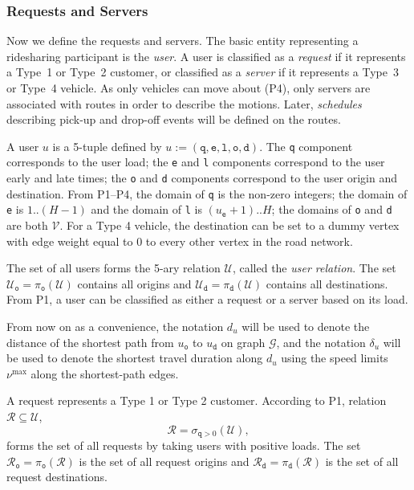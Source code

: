 \documentclass{article}
\newcommand{\hi}[1]{\noindent {\bf #1}}     %
\theoremstyle{definition}                   %
\begin{document}
\subsubsection{Requests and Servers}
\label{sec:requests-and-servers}
Now we define the requests and servers.
The basic entity representing a ridesharing participant is the \emph{user}.  A
user is classified as a \emph{request} if it represents a Type~1 or Type~2
customer, or classified as a \emph{server} if it represents a Type~3 or Type~4
vehicle. As only vehicles can move about (P4), only servers are associated with
routes in order to describe the motions. Later, \emph{schedules} describing
pick-up and drop-off events will be defined on the routes.

\hi{User Relation}
A user $u$ is a 5-tuple defined by
${u:=(\texttt{q},\texttt{e},\texttt{l},\texttt{o},\texttt{d})}$.  The
\texttt{q} component corresponds to the user load; the \texttt{e} and
\texttt{l} components correspond to the user early and late times; the
\texttt{o} and \texttt{d} components correspond to the user origin and
destination.
From P1--P4, the domain of \texttt{q} is the non-zero integers; the domain of \texttt{e} is
$1..(H-1)$ and the domain of \texttt{l} is $(u_\texttt{e}+1)..H$; the domains
of \texttt{o} and \texttt{d} are both $\mathcal{V}$.
For a Type 4 vehicle, the destination can be set to a dummy vertex with edge
weight equal to 0 to every other vertex in the road network.

The set of all users forms the 5-ary relation $\mathcal{U}$, called
the \emph{user relation}.
The set
$\mathcal{U}_\texttt{o}=\pi_\texttt{o}(\mathcal{U})$ contains all origins and
$\mathcal{U}_\texttt{d}=\pi_\texttt{d}(\mathcal{U})$ contains all destinations.
From P1, a user can be classified as either a request or a server based on its load.

From now on as a convenience, the notation $d_u$ will be used to denote the distance of the
shortest path from $u_\texttt{o}$ to $u_\texttt{d}$ on graph $\mathcal{G}$, and
the notation $\delta_u$ will be used to denote the shortest travel duration
along $d_u$ using the speed limits $\nu^\textrm{max}$ along the shortest-path edges.

\hi{Requests.}
A request represents a Type 1 or Type 2 customer.
According to P1,
relation $\mathcal{R}\subseteq\mathcal{U}$,
$$\mathcal{R}=\sigma_{\texttt{q}>0}(\mathcal{U}),$$
forms the set of all requests by taking users with positive loads. The set
$\mathcal{R}_\texttt{o}=\pi_\texttt{o}(\mathcal{R})$ is the set of all request origins and
$\mathcal{R}_\texttt{d}=\pi_\texttt{d}(\mathcal{R})$ is the set of all request destinations.
\end{document}
